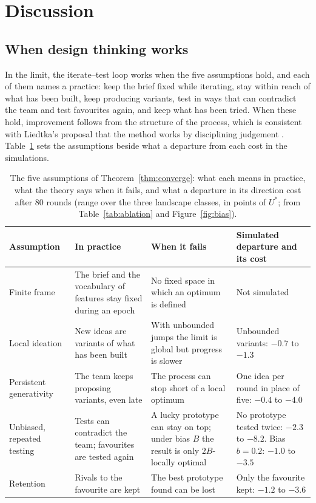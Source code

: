 \documentclass[preprint,review,11pt,authoryear]{elsarticle}
\theoremstyle{definition}
\begin{document}
\section{Discussion}
\label{sec:discussion}

\subsection{When design thinking works}

In the limit, the iterate--test loop works when the five assumptions hold, and each of them names a practice: keep the brief fixed while iterating, stay within reach of what has been built, keep producing variants, test in ways that can contradict the team and test favourites again, and keep what has been tried. When these hold, improvement follows from the structure of the process, which is consistent with Liedtka's proposal that the method works by disciplining judgement \citep{liedtka2015}. Table~\ref{tab:conditions} sets the assumptions beside what a departure from each cost in the simulations.

\begin{table}[!htbp]
\caption{The five assumptions of Theorem~\ref{thm:converge}: what each means in practice, what the theory says when it fails, and what a departure in its direction cost after 80 rounds (range over the three landscape classes, in points of $U^*$; from Table~\ref{tab:ablation} and Figure~\ref{fig:bias}).}
\label{tab:conditions}
\centering\small
\begin{tabularx}{\textwidth}{@{}p{2.4cm}XXp{3.9cm}@{}}
\toprule
Assumption & In practice & When it fails & Simulated departure and its cost\\
\midrule
Finite frame & The brief and the vocabulary of features stay fixed during an epoch & No fixed space in which an optimum is defined & Not simulated\\
Local ideation & New ideas are variants of what has been built & With unbounded jumps the limit is global but progress is slower & Unbounded variants: $-0.7$ to $-1.3$\\
Persistent generativity & The team keeps proposing variants, even late & The process can stop short of a local optimum & One idea per round in place of five: $-0.4$ to $-4.0$\\
Unbiased, repeated testing & Tests can contradict the team; favourites are tested again & A lucky prototype can stay on top; under bias $B$ the result is only $2B$-locally optimal & No prototype tested twice: $-2.3$ to $-8.2$. Bias $b=0.2$: $-1.0$ to $-3.5$\\
Retention & Rivals to the favourite are kept & The best prototype found can be lost & Only the favourite kept: $-1.2$ to $-3.6$\\
\bottomrule
\end{tabularx}
\end{table}
\end{document}
